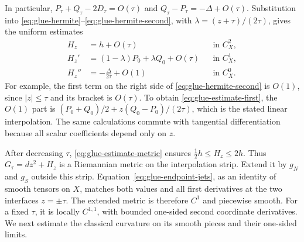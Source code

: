 \documentclass[12pt]{amsart}
\numberwithin{equation}{section}
\theoremstyle{remark}
\begin{document}
In particular,
\(P_\tau+Q_\tau-2D_\tau=O(\tau)\) and
\(Q_\tau-P_\tau=-\Delta+O(\tau)\). Substitution into
\eqref{eq:glue-hermite}--\eqref{eq:glue-hermite-second}, with
\(\lambda=(z+\tau)/(2\tau)\), gives the uniform estimates
\begin{align}
 H_z&=h+O(\tau)&&\text{in }C_X^2,
 \label{eq:glue-estimate-metric}\\
 H_z'&=(1-\lambda)P_0+\lambda Q_0+O(\tau)
       &&\text{in }C_X^1,
 \label{eq:glue-estimate-first}\\
 H_z''&=-\frac{\Delta}{2\tau}+O(1)
       &&\text{in }C_X^0.
 \label{eq:glue-estimate-second}
\end{align}
For example, the first term on the right side of
\eqref{eq:glue-hermite-second} is \(O(1)\), since
\(|z|\le\tau\) and its bracket is \(O(\tau)\). To obtain
\eqref{eq:glue-estimate-first}, the \(O(1)\) part is
\((P_0+Q_0)/2+z(Q_0-P_0)/(2\tau)\), which is the stated
linear interpolation. The same calculations commute with
tangential differentiation because all scalar coefficients
depend only on \(z\).

After decreasing \(\tau\), \eqref{eq:glue-estimate-metric}
ensures \(\tfrac12h\le H_z\le2h\). Thus
\(G_\tau=dz^2+H_z\) is a Riemannian metric on the interpolation
strip. Extend it by \(g_N\) and \(g_S\) outside this strip.
Equation~\eqref{eq:glue-endpoint-jets}, as an identity of smooth
tensors on \(X\), matches both values and all first derivatives
at the two interfaces \(z=\pm\tau\). The extended metric is
therefore \(C^1\) and piecewise smooth. For a fixed \(\tau\),
it is locally \(C^{1,1}\), with bounded one-sided second
coordinate derivatives. We next estimate the classical curvature
on its smooth pieces and their one-sided limits.
\end{document}
